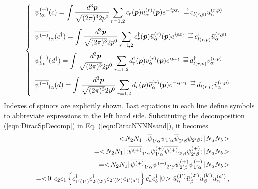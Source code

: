 \begin{eqnarray}
\left\{
\begin{array}{l}
\displaystyle
\psi^{(+)}_{l \alpha} (c)
=
\int \frac{d^3 \bld{p}}{\sqrt{(2\pi)^3} 2 p^0}
\sum_{r=1,2}
c_r (\bld{p}) u_\alpha^{(r)} (\bld{p}) e^{-ipx_l}
\;\rightdef
c_{l (r, p)} u_\alpha^{(r,p)}
\vspace{2mm}
\\
\displaystyle
\overline{\psi^{(+)}}_{l \alpha} (c^\dagger)
=
\int \frac{d^3 \bld{p}}{\sqrt{(2\pi)^3} 2 p^0}
\sum_{r=1,2}
c_r^\dagger (\bld{p}) \bar{u}_\alpha^{(r)} (\bld{p}) e^{ipx_l}
\;\rightdef
c^\dagger_{l (r, p)} \bar{u}_\alpha^{(r,p)}
\vspace{2mm}
\\
\displaystyle
\psi^{(-)}_{l \alpha} (d^\dagger)
=
\int \frac{d^3 \bld{p}}{\sqrt{(2\pi)^3} 2 p^0}
\sum_{r=1,2}
d^\dagger_r (\bld{p}) v_\alpha^{(r)} (\bld{p}) e^{ipx_l}
\;\rightdef
d^\dagger_{l (r, p)} v_\alpha^{(r,p)}
\vspace{2mm}
\\
\displaystyle
\overline{\psi^{(-)}}_{l \alpha} (d)
=
\int \frac{d^3 \bld{p}}{\sqrt{(2\pi)^3} 2 p^0}
\sum_{r=1,2}
d_r (\bld{p}) \bar{v}_\alpha^{(r)} (\bld{p}) e^{-ipx_l}
\;\rightdef
d_{l (r, p)} \bar{v}_\alpha^{(r,p)}
\end{array}
\right.
\label{eqn:DiracFDecompDef}
\end{eqnarray}
Indexes of spinors are explicitly shown. 
Last equations in each line define symbols to abbreviate 
expressions in the left hand side.
Substituting the decomposition 
(\ref{eqn:DiracSpDecomp}) in
Eq. (\ref{eqn:DiracNNNNsand}), it becomes
\begin{eqnarray}
&&\bra N_2 N_1 \braend
\normalprod{\overline{\psi}_{1' \alpha} \psi_{1' \alpha}
 \overline{\psi}_{2' \beta} \psi_{2' \beta}
}
\ketend N_a N_b \ket
\nonumber\\
&&=
\bra N_2 N_1 \braend
\normalprod{\overline{\psi^{(+)}}_{1' \alpha} \psi^{(+)}_{1' \alpha}
 \overline{\psi^{(+)}}_{2' \beta} \psi^{(+)}_{2' \beta}
}
\ketend N_a N_b \ket
\nonumber\\
&&=
\bra N_2 N_1 \braend
\overline{\psi^{(+)}}_{1' \alpha}  \overline{\psi^{(+)}}_{2' \beta} 
\psi^{(+)}_{2' \beta} \psi^{(+)}_{1' \alpha}
\ketend N_a N_b \ket
\nonumber\\
&&=
\bra 0 \braend c_{2} c_1 \left\{
c^\dagger_{1'(1')} c^\dagger_{2'(2')} c_{2'(b')} c_{1'(a')}
\right\}
c^\dagger_{a} c^\dagger_{b} \ketend 0 \ket
\bar{u}_\alpha^{(1')} \bar{u}_\beta^{(2')} u_\beta^{(b')}u_\alpha^{(a')}
\,,
\nonumber\\
\label{eqn:DirNNNNsandIntermed}
\end{eqnarray}
